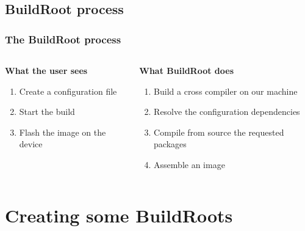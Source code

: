 \subsection{BuildRoot process}
\begin{frame}
  \frametitle{The BuildRoot process}
  \begin{columns}[t] %
    \begin{column}{.5\textwidth}
      \textbf{What the user sees}
      \begin{enumerate}
        \item Create a configuration file
        \item Start the build
        \item Flash the image on the device
      \end{enumerate}
    \end{column}
    \begin{column}{.5\textwidth}
      \textbf{What BuildRoot does}
      \begin{enumerate}
        \item Build a cross compiler on our machine
        \item Resolve the configuration dependencies
        \item Compile from source the requested packages
        \item Assemble an image
      \end{enumerate}
    \end{column}
  \end{columns}
\end{frame}
\section{Creating some BuildRoots}

